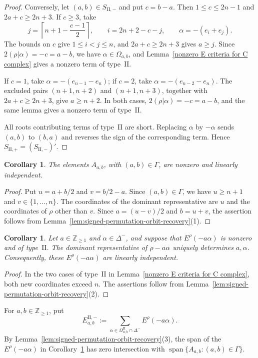 \documentclass[11pt,a4paper]{amsart}
\newcommand{\ZZ}{\mathbb Z}
\theoremstyle{plain}
\newtheorem{cor}[theorem]{Corollary}
\numberwithin{equation}{section}
\newenvironment{pf}{\begin{proof}}{\end{proof}}
\begin{document}
\begin{pf}
Conversely, let \((a,b)\in S_{\mathrm{II},-}\) and put
\(c=b-a\). Then \(1\le c\le2n-1\) and
\(2a+c\ge2n+3\). If \(c\ge3\), take
\[
j=\left\lceil n+1-\frac{c-1}{2}\right\rceil,
\qquad i=2n+2-c-j,
\qquad \alpha=-(e_i+e_j).
\]
The bounds on \(c\) give \(1\le i<j\le n\), and
\(2a+c\ge2n+3\) gives \(a\ge j\).
Since \(2(\rho|\alpha)=-c=a-b\), we have
\(\alpha\in\Omega_{a,b}\), and
Lemma~\ref{nonzero E criteria for C complex} gives a nonzero
term of type~\(\mathrm{II}\).

If \(c=1\), take \(\alpha=-(e_{n-1}-e_n)\); if \(c=2\),
take \(\alpha=-(e_{n-2}-e_n)\).
The excluded pairs \((n+1,n+2)\) and \((n+1,n+3)\), together
with \(2a+c\ge2n+3\), give \(a\ge n+2\).
In both cases, \(2(\rho|\alpha)=-c=a-b\), and the same
lemma gives a nonzero term of type~\(\mathrm{II}\).

All roots contributing terms of type~\(\mathrm{II}\) are short.
Replacing \(\alpha\) by \(-\alpha\) sends \((a,b)\) to
\((b,a)\) and reverses the sign of the corresponding term.
Hence \(S_{\mathrm{II},+}=(S_{\mathrm{II},-})'\).
\end{pf}
\begin{cor}\label{independent type I C}
The elements \(A_{a,b}\), with \((a,b)\in\Gamma\), are nonzero
and linearly independent.
\end{cor}

\begin{pf}
Put \(u=a+b/2\) and \(v=b/2-a\). Since \((a,b)\in\Gamma\),
we have \(u\ge n+1\) and \(v\in\{1,\ldots,n\}\).
The coordinates of the dominant representative are \(u\) and the
coordinates of \(\rho\) other than \(v\). Since \(a=(u-v)/2\) and \(b=u+v\), the assertion
follows from Lemma~\ref{lem:signed-permutation-orbit-recovery}(1).
\end{pf}
\begin{cor}\label{EPII=0 for C}
Let \(a\in\ZZ_{\ge1}\) and \(\alpha\in\Delta^-\), and suppose
that \(E^\rho(-a\alpha)\) is nonzero and of type~\(\mathrm{II}\).
The dominant representative of \(\rho-a\alpha\) uniquely
determines \(a,\alpha\).
Consequently, these \(E^\rho(-a\alpha)\) are linearly independent.
\end{cor}

\begin{pf}
In the two cases of type~\(\mathrm{II}\) in
Lemma~\ref{nonzero E criteria for C complex}, both new coordinates
exceed \(n\). The assertions follow from
Lemma~\ref{lem:signed-permutation-orbit-recovery}(2).
\end{pf}
For \(a,b\in\ZZ_{\ge1}\), put
\[
E_{a,b}^{\mathrm{II},-}
:=\sum_{\alpha\in\Omega_{a,b}^{\mathrm{II}}\cap\Delta^-}
E^\rho(-a\alpha).
\]
By Lemma~\ref{lem:signed-permutation-orbit-recovery}(3),
the span of the \(E^\rho(-a\alpha)\) in
Corollary~\ref{EPII=0 for C} has zero intersection with
\(\operatorname{span}\{A_{a,b}:(a,b)\in\Gamma\}\).
\end{document}

